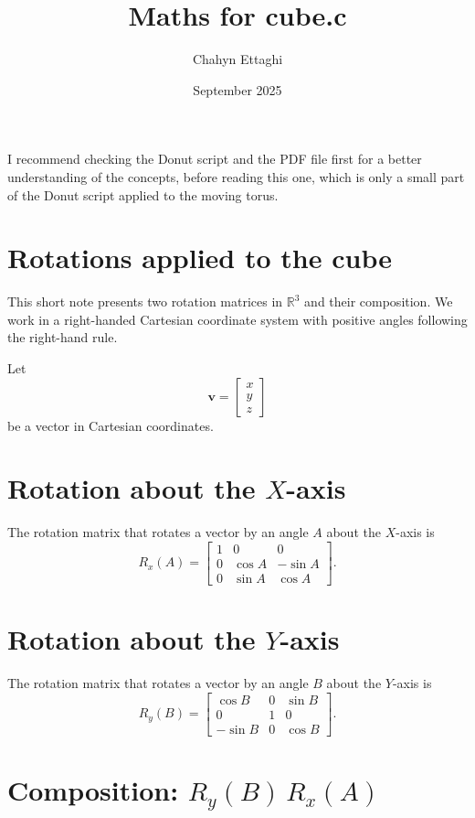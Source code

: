 \documentclass{article}
\title{Maths for cube.c}
\author{Chahyn Ettaghi}
\date{September 2025}
\begin{document}
\maketitle

I recommend checking the Donut script and the PDF file first for a better understanding of the concepts, before reading this one, which is only a small part of the Donut script applied to the moving torus.
\section*{Rotations applied to the cube}

This short note presents two rotation matrices in $\mathbb{R}^3$ and their composition. We work in a right-handed Cartesian coordinate system with positive angles following the right-hand rule.

\medskip

Let
\[
\bm{v} = \begin{bmatrix} x \\ y \\ z \end{bmatrix}
\]
be a vector in Cartesian coordinates.

\section*{Rotation about the $X$-axis}

The rotation matrix that rotates a vector by an angle $A$ about the $X$-axis is
\[
R_x(A) = \begin{bmatrix}
1 & 0 & 0 \\
0 & \cos A & -\sin A \\
0 & \sin A & \cos A
\end{bmatrix}.
\]

\section*{Rotation about the $Y$-axis}

The rotation matrix that rotates a vector by an angle $B$ about the $Y$-axis is
\[
R_y(B) = \begin{bmatrix}
\cos B & 0 & \sin B \\
0 & 1 & 0 \\
-\sin B & 0 & \cos B
\end{bmatrix}.
\]

\section*{Composition: $R_y(B)\,R_x(A)$}
\end{document}
